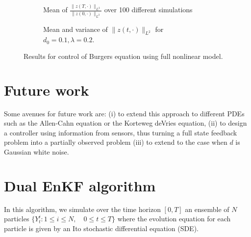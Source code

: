\documentclass[10pt,a4paper]{amsart}
\begin{document}
\begin{figure}
\centering
    \begin{subfigure}[b]{0.45\textwidth}
        \centering
        
        \caption{Mean of $\frac{\|z(T,\cdot)\|_{L^2}}{\|z(0,\cdot)\|_{L^2}}$ over 100 different simulations}
        \label{fig:heatmap-full}
    \end{subfigure}
%
    \begin{subfigure}[b]{0.45\textwidth}
        \centering
        
        \caption{Mean and variance of $\|z(t,\cdot)\|_{L^2}$ for $d_0=0.1,\lambda=0.2$.}
        \label{fig:time-full}
    \end{subfigure}
\caption{Results for control of Burgers equation using full nonlinear model.}
\label{fig:full}
\end{figure}


\section{Future work}
Some avenues for future work are: (i) to extend this approach to different PDEs such as the Allen-Cahn equation or the Korteweg deVries equation, (ii) to design a controller using information from sensors, thus turning a full state feedback problem into a partially observed problem (iii) to extend to the case when $d$ is Gaussian white noise. 

\section{Dual EnKF algorithm}
\label{app:enkf}
In this algorithm, we simulate over the time horizon $[0,T]$ an ensemble of $N$ particles $\{ Y_t^i : 1 \le i \le N, \quad 0 \le t \le T \}$ where the evolution equation for each particle is given by an Ito stochastic differential equation (SDE). 
\end{document}

